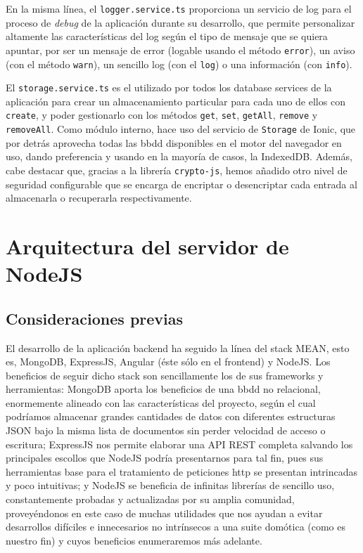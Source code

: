 \vspace{0.5cm}

En la misma línea, el \verb|logger.service.ts| proporciona un servicio de log para el proceso de \textit{debug} de la aplicación durante su desarrollo, que permite personalizar altamente las características del log según el tipo de mensaje que se quiera apuntar, por ser un mensaje de error (logable usando el método \verb|error|), un aviso (con el método \verb|warn|), un sencillo log (con el \verb|log|) o una información (con \verb|info|).

\vspace{1cm}

El \verb|storage.service.ts| es el utilizado por todos los database services de la aplicación para crear un almacenamiento particular para cada uno de ellos con \verb|create|, y poder gestionarlo con los métodos \verb|get|, \verb|set|, \verb|getAll|, \verb|remove| y \verb|removeAll|. Como módulo interno, hace uso del servicio de \verb|Storage| de Ionic, que por detrás aprovecha todas las \gls{bbdd} disponibles en el motor del navegador en uso, dando preferencia y usando en la mayoría de casos, la \gls{IndexedDB}. Además, cabe destacar que, gracias a la librería \verb|crypto-js|, hemos añadido otro nivel de seguridad configurable que se encarga de encriptar o desencriptar cada entrada al almacenarla o recuperarla respectivamente.

\section{Arquitectura del servidor de NodeJS}
\label{ch:Capitulo4.8}

\subsection{Consideraciones previas}
\label{ch:Capitulo4.8.1}

El desarrollo de la aplicación backend ha seguido la línea del stack MEAN, esto es, MongoDB, ExpressJS, Angular (éste sólo en el frontend) y NodeJS. Los beneficios de seguir dicho stack son sencillamente los de sus frameworks y herramientas: MongoDB aporta los beneficios de una \gls{bbdd} no relacional, enormemente alineado con las características del proyecto, según el cual podríamos almacenar grandes cantidades de datos con diferentes estructuras JSON bajo la misma lista de documentos sin perder velocidad de acceso o escritura; ExpressJS nos permite elaborar una API REST completa salvando los principales escollos que NodeJS podría presentarnos para tal fin, pues sus herramientas base para el tratamiento de peticiones http se presentan intrincadas y poco intuitivas; y NodeJS se beneficia de infinitas librerías de sencillo uso, constantemente probadas y actualizadas por su amplia comunidad, proveyéndonos en este caso de muchas utilidades que nos ayudan a evitar desarrollos difíciles e innecesarios no intrínsecos a una suite domótica (como es nuestro fin) y cuyos beneficios enumeraremos más adelante.

